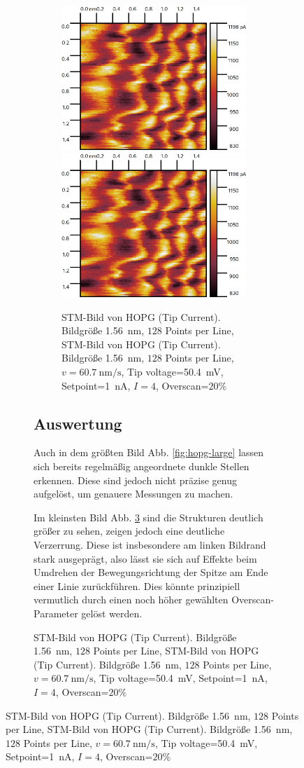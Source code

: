 \documentclass{article}
\begin{document}
\begin{figure}[h]
\begin{figure}[h]
\begin{figure}[h]
    \centering
    \includegraphics[width=0.5\linewidth]{hopg-small}
    \includegraphics[width=0.5\linewidth]{hopg-small}
    \caption{
        STM-Bild von HOPG (Tip Current). Bildgröße \SI{1.56}{\nm}, $128$ Points per Line,
        STM-Bild von HOPG (Tip Current). Bildgröße \SI{1.56}{\nm}, $128$ Points per Line,
        $v=\SI{60.7}{\nm\per\s}$, Tip voltage=\SI{50.4}{\mV}, Setpoint=\SI{1}{\nA}, $I=4$, Overscan=$20\%$
    }
    \label{fig:hopg-small}
\end{figure}


\subsection{Auswertung}
Auch in dem größten Bild Abb. \ref{fig:hopg-large} lassen sich bereits regelmäßig angeordnete dunkle Stellen erkennen.
Diese sind jedoch nicht präzise genug aufgelöst, um genauere Messungen zu machen.

Im kleinsten Bild Abb. \ref{fig:hopg-small} sind die Strukturen deutlich größer zu sehen, zeigen jedoch eine deutliche Verzerrung.
Diese ist insbesondere am linken Bildrand stark ausgeprägt, also lässt sie sich auf Effekte beim Umdrehen der Bewegungsrichtung der
Spitze am Ende einer Linie zurückführen. Dies könnte prinzipiell vermutlich durch einen noch höher gewählten Overscan-Parameter
gelöst werden.


\end{figure}
\end{figure}
\end{document}

